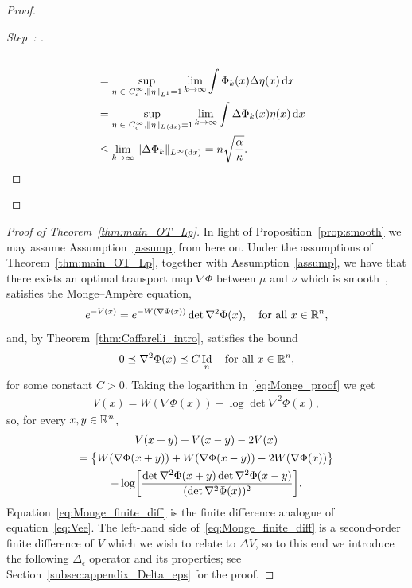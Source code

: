 \documentclass[10pt]{amsart}
\theoremstyle{definition}\newtheorem{defi}[theo]{Definition}\newtheorem{rema}[theo]{Remark}\newtheorem{exam}[theo]{Example}\newtheorem{exem}[theo]{Example}\newtheorem{nota}[theo]{Notation}
\newcommand{\R}{\mathbb R}
\DeclareMathOperator{\Id}{Id}
\newcommand{\V}{V}
\newcommand{\W}{W}
\newcommand{\dd}{n}
\newcommand{\source}{\mu}
\newcommand{\target}{\nu}
\newcommand{\lsh}{\alpha}
\newcommand{\lc}{\kappa}
\newcommand*\diff{\mathop{}\!\mathrm{d}}
\newcommand{\OT}{\Phi}
\renewcommand*{\to}{\mathchoice{\longrightarrow}{\rightarrow}{\rightarrow}{\rightarrow}}
\let\originalleft\left
\let\originalright\right
\renewcommand{\left}{\mathopen{}\mathclose\bgroup\originalleft}
\renewcommand{\right}{\aftergroup\egroup\originalright}
\let\oldin\in
\renewcommand{\in}{\mathchoice{\oldin}{\oldin}{\,\oldin\,}{\,\oldin\,}}
\newcounter{setofstep}
\newcounter{step}[setofstep]
\newenvironment{step}[1][]{\refstepcounter{step}\begin{proof}[{Step~\thestep\if#1\empty\else: #1\fi}]}{\let\qed\relax\end{proof}}
\begin{document}
\begin{proof}
\begin{step}
\begin{align*}
\\
&=\sup_{\substack{\eta \in C_{c}^{\infty}, \|\eta\|_{L^1}=1}} \lim_{k \to \infty} \int \Phi_{k}(x) \Delta \eta(x) \diff x\\
&=\sup_{\eta \in C_{c}^{\infty}, \|\eta\|_{L^{}(\diff x)}=1} \lim_{k \to \infty} \int \Delta \Phi_{k}(x) \eta(x) \diff x
\\
&\le \lim_{k\to \infty} \|\Delta \Phi_{k}\|_{L^{\infty}(\diff x)}=\dd\sqrt{ \frac{\lsh}{\lc}}.\qedhere
\end{align*}
\end{step}\let\qed\relax
\end{proof}


\begin{proof}[Proof of Theorem~\ref{thm:main_OT_Lp}]
In light of Proposition~\ref{prop:smooth} we may assume Assumption~\ref{assump} from here on. Under the assumptions of Theorem~\ref{thm:main_OT_Lp}, together with Assumption~\ref{assump}, we have that there exists an optimal transport map $\nabla\OT$ between $\source$ and $\target$ which is smooth~\cite[Theorem~1.1]{Dario2019}, satisfies the Monge--Ampère equation,
\begin{equation}\label{eq:Monge_proof}
e^{-\V(x)}=e^{-\W(\nabla \OT(x))}\det\nabla^2\OT(x), \quad \text{for all }x\in \R^{\dd},
\end{equation}
and, by Theorem~\ref{thm:Caffarelli_intro}, satisfies the bound
\begin{equation}\label{eq:Caffarelli_bound}
0\preceq\nabla^2\OT(x)\preceq C\Id_{\dd}\quad \text{for all }x\in \R^{\dd},
\end{equation}
for some constant $C>0$. Taking the logarithm in~\eqref{eq:Monge_proof} we get
\begin{align}\label{eq:Monge_log}
\V(x)=\W(\nabla\OT(x))-\log \det \nabla^2\OT(x),
\end{align}
so, for every $x,y\in \R^{\dd}$,
\begin{multline}\label{eq:Monge_finite_diff}
V(x+y)+V(x-y)-2V(x)\\
=\bigl\{\W(\nabla\OT(x+y))+\W(\nabla\OT(x-y))-2\W(\nabla\OT(x))\bigr\}
\\
-\log\left[\frac{\det \nabla^2\OT(x+y)\det \nabla^2\OT(x-y)}{(\det \nabla^2\OT(x))^2}\right].
\end{multline}
Equation~\eqref{eq:Monge_finite_diff} is the finite difference analogue of equation~\eqref{eq:Vee}. The left-hand side of~\eqref{eq:Monge_finite_diff} is a second-order finite difference of $\V$ which we wish to relate to $\Delta\V$, so to this end we introduce the following $\Delta_{\epsilon}$ operator and its properties; see Section~\ref{subsec:appendix_Delta_eps} for the proof.



\end{proof}
\end{document}
